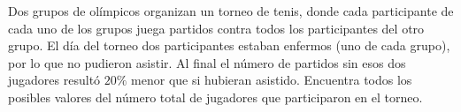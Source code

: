 Dos grupos de olímpicos organizan un torneo de tenis, donde cada participante de cada uno de los grupos juega partidos contra todos los participantes del otro grupo. El día del torneo dos participantes estaban enfermos (uno de cada grupo), por lo que no pudieron asistir. Al final el número de partidos sin esos dos jugadores resultó $20\%$ menor que si hubieran asistido. Encuentra todos los posibles valores del número total de jugadores que participaron en el torneo.